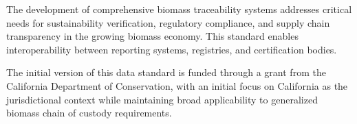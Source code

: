 
The development of comprehensive biomass traceability systems addresses critical needs for sustainability verification, regulatory compliance, and supply chain transparency in the growing biomass economy. This standard enables interoperability between reporting systems, registries, and certification bodies.

\begin{informative}[title=Funding and Jurisdictional Context]
The initial version of this data standard is funded through a grant from the California Department of Conservation, with an initial focus on California as the jurisdictional context while maintaining broad applicability to generalized biomass chain of custody requirements.
\end{informative}